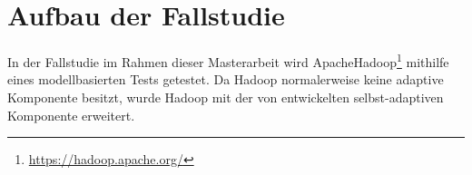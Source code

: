 \chapter{Aufbau der Fallstudie}\label{sec:fallstudie}

In der Fallstudie im Rahmen dieser Masterarbeit wird Apache\texttrademark Hadoop\textregistered\footnote{\url{https://hadoop.apache.org/}} mithilfe eines modellbasierten Tests getestet. Da Hadoop normalerweise keine adaptive Komponente besitzt, wurde Hadoop mit der von \citeauthor{zhang2016} entwickelten selbst-adaptiven Komponente erweitert.

%






